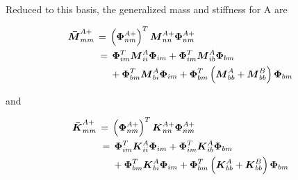 \documentclass[11pt,openany,twoside]{book}
\numberwithin{equation}{section}		%
\newcommand{\Matrix}[1]{\boldsymbol{#1}}
\begin{document}
Reduced to this basis, the generalized mass and stiffness for A are

\begin{equation}
\begin{split}
\Matrix{\bar{M}}_{mm}^{A+} \, & = \,
        \left( \Matrix{\Phi}_{nm}^{A+} \right)^T
                \Matrix{M}_{nn}^{A+} \Matrix{\Phi}_{nm}^{A+} \\
        & \, = \, \Matrix{\Phi}_{im}^T \Matrix{M}_{ii}^A \Matrix{\Phi}_{im}
                + \Matrix{\Phi}_{im}^T \Matrix{M}_{ib}^A \Matrix{\Phi}_{bm} \\
         & \mbox{\hspace{0.2in}} +
                        \Matrix{\Phi}_{bm}^T \Matrix{M}_{bi}^A \Matrix{\Phi}_{im} +
                        \Matrix{\Phi}_{bm}^T \left(\Matrix{M}_{bb}^A +
                        \Matrix{M}_{bb}^B \right) \Matrix{\Phi}_{bm}
\end{split}
\end{equation}


and

\begin{equation}
\begin{split}
\Matrix{\bar{K}}_{mm}^{A+} \, & = \,
                        \left( \Matrix{\Phi}_{nm}^{A+} \right)^T
                        \Matrix{K}_{nn}^{A+} \Matrix{\Phi}_{nm}^{A+} \\
        & \, = \, \Matrix{\Phi}_{im}^T \Matrix{K}_{ii}^A \Matrix{\Phi}_{im} +
                        \Matrix{\Phi}_{im}^T \Matrix{K}_{ib}^A \Matrix{\Phi}_{bm} \\
        & \mbox{\hspace{0.2in}} +
                \Matrix{\Phi}_{bm}^T \Matrix{K}_{bi}^A \Matrix{\Phi}_{im} +
                \Matrix{\Phi}_{bm}^T \left(\Matrix{K}_{bb}^A +
                \Matrix{K}_{bb}^B \right) \Matrix{\Phi}_{bm}
\end{split}
\end{equation}
\end{document}
